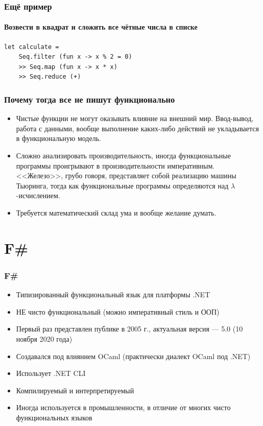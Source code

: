 \documentclass[xetex,mathserif,serif]{beamer}
\begin{document}
    \begin{frame}[fragile]
        \frametitle{Ещё пример}
        \framesubtitle{Возвести в квадрат и сложить все чётные числа в списке}
        \begin{verbatim}
let calculate = 
    Seq.filter (fun x -> x % 2 = 0) 
    >> Seq.map (fun x -> x * x) 
    >> Seq.reduce (+)
        \end{verbatim}
    \end{frame}

    \begin{frame}
        \frametitle{Почему тогда все не пишут функционально}
        \begin{itemize}
            \item Чистые функции не могут оказывать влияние на внешний мир. Ввод-вывод, работа с данными,
                    вообще выполнение каких-либо действий не укладывается в функциональную модель.
            \item Сложно анализировать производительность, иногда функциональные программы проигрывают
                    в производительности императивным. <<Железо>>, грубо говоря, представляет собой 
                    реализацию машины Тьюринга, тогда как функциональные программы определяются над
                    $\lambda$-исчислением.
            \item Требуется математический склад ума и вообще желание думать.
        \end{itemize}
    \end{frame}

    \section{F\#}

    \begin{frame}
        \frametitle{F\#}
        \begin{itemize}
            \item Типизированный функциональный язык для платформы .NET
            \item НЕ чисто функциональный (можно императивный стиль и ООП)
            \item Первый раз представлен публике в 2005 г., актуальная версия --- 5.0 (10 ноября 2020 года)
            \item Создавался под влиянием OCaml (практически диалект OCaml под .NET)
            \item Использует .NET CLI
            \item Компилируемый и интерпретируемый
            \item Иногда используется в промышленности, в отличие от многих чисто функциональных языков
        \end{itemize}
    \end{frame}
\end{document}
